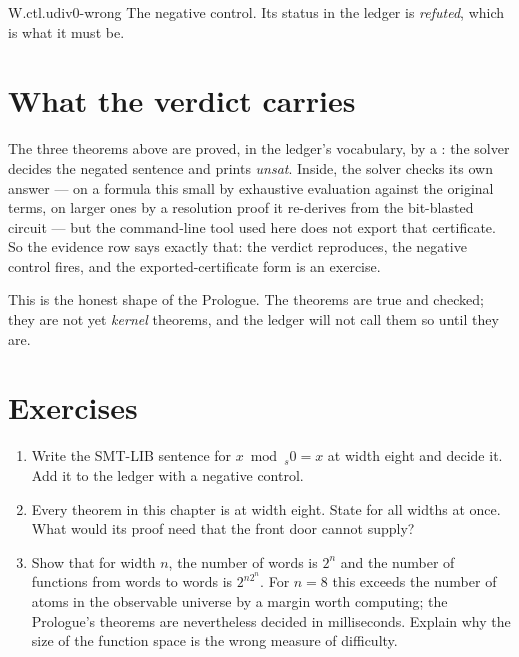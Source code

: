 \begin{artifact}{W.ctl.udiv0-wrong}
The negative control. Its status in the ledger is \emph{refuted}, which is what it must be.
\end{artifact}

\section{What the verdict carries}
\label{sec:verdict}

The three theorems above are proved, in the ledger's vocabulary, by a : the solver decides the negated sentence and prints \emph{unsat}. Inside, the solver checks its own answer --- on a formula this small by exhaustive evaluation against the original terms, on larger ones by a resolution proof it re-derives from the bit-blasted circuit --- but the command-line tool used here does not export that certificate. So the evidence row says exactly that: the verdict reproduces, the negative control fires, and the exported-certificate form is an exercise.

This is the honest shape of the Prologue. The theorems are true and checked; they are not yet \emph{kernel} theorems, and the ledger will not call them so until they are.

\section{Exercises}

\begin{enumerate}
\item Write the SMT-LIB sentence for \(x \bmod_s 0 = x\) at width eight and decide it. Add it to the ledger with a negative control.
\item Every theorem in this chapter is at width eight. State  for all widths at once. What would its proof need that the front door cannot supply?
\item Show that for width \(n\), the number of words is \(2^n\) and the number of functions from words to words is \(2^{n 2^n}\). For \(n = 8\) this exceeds the number of atoms in the observable universe by a margin worth computing; the Prologue's theorems are nevertheless decided in milliseconds. Explain why the size of the function space is the wrong measure of difficulty.
\end{enumerate}
